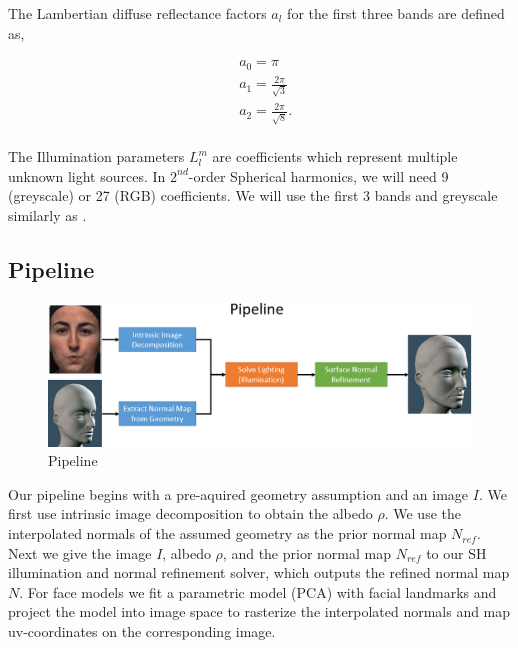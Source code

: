\documentclass[10pt,twocolumn,letterpaper]{article}
\begin{document}
The Lambertian diffuse reflectance factors $a_l$ for the first three bands are defined as,

\begin{equation}
\begin{split}
&a_0 = \pi\\
&a_1 = \frac{2\pi}{\sqrt{3}}\\
&a_2 = \frac{2\pi}{\sqrt{8}}.\\
\end{split}
\end{equation}

The Illumination parameters $L_l^m$ are coefficients which represent multiple unknown light sources. In $2^{nd}$-order Spherical harmonics, we will need 9 (greyscale) or 27 (RGB) coefficients. We will use the first 3 bands and greyscale similarly as \cite{sfs}.

\subsection{Pipeline} 
\begin{figure}[!h]
    \begin{center}
        \includegraphics [scale=0.35] {image/pipeline.png}
    \end{center}
    \caption{Pipeline}
    \label{fig:pipe1}
\end{figure} 
Our pipeline begins with a pre-aquired geometry assumption and an image $I$. We first use intrinsic image decomposition to obtain the albedo $\rho$. We use the interpolated normals of the assumed geometry as the prior normal map $N_{ref}$. Next we give the image $I$, albedo $\rho$, and the prior normal map $N_{ref}$ to our SH illumination and normal refinement solver, which outputs the refined normal map $N$. For face models we fit a parametric model (PCA) with facial landmarks\cite{pca} and project the model into image space to rasterize the interpolated normals and map uv-coordinates on the corresponding image.
\end{document}
